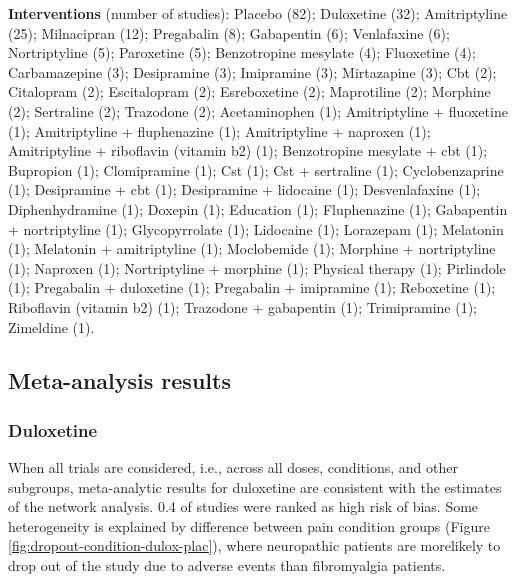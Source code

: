 \documentclass{report}\usepackage[]{graphicx}\usepackage[]{color}
\begin{document}
\textbf{Interventions} (number of studies): Placebo (82); Duloxetine (32); Amitriptyline (25); Milnacipran (12); Pregabalin (8); Gabapentin (6); Venlafaxine (6); Nortriptyline (5); Paroxetine (5); Benzotropine mesylate (4); Fluoxetine (4); Carbamazepine (3); Desipramine (3); Imipramine (3); Mirtazapine (3); Cbt (2); Citalopram (2); Escitalopram (2); Esreboxetine (2); Maprotiline (2); Morphine (2); Sertraline (2); Trazodone (2); Acetaminophen (1); Amitriptyline + fluoxetine (1); Amitriptyline + fluphenazine (1); Amitriptyline + naproxen (1); Amitriptyline + riboflavin (vitamin b2) (1); Benzotropine mesylate + cbt (1); Bupropion (1); Clomipramine (1); Cst (1); Cst + sertraline (1); Cyclobenzaprine (1); Desipramine + cbt (1); Desipramine + lidocaine (1); Desvenlafaxine (1); Diphenhydramine (1); Doxepin (1); Education (1); Fluphenazine (1); Gabapentin + nortriptyline (1); Glycopyrrolate (1); Lidocaine (1); Lorazepam (1); Melatonin (1); Melatonin + amitriptyline (1); Moclobemide (1); Morphine + nortriptyline (1); Naproxen (1); Nortriptyline + morphine (1); Physical therapy (1); Pirlindole (1); Pregabalin + duloxetine (1); Pregabalin + imipramine (1); Reboxetine (1); Riboflavin (vitamin b2) (1); Trazodone + gabapentin (1); Trimipramine (1); Zimeldine (1).

\subsection{Meta-analysis results}

\subsubsection{Duloxetine}

When all trials are considered, i.e., across all doses,  conditions, and other subgroups, meta-analytic results for duloxetine are consistent with the estimates of the network analysis. 0.4 of studies were ranked as high risk of bias. Some heterogeneity is explained by difference between pain condition groups (Figure \ref{fig:dropout-condition-dulox-plac}), where neuropathic patients are morelikely to drop out of the study due to adverse events than fibromyalgia patients.
\end{document}
